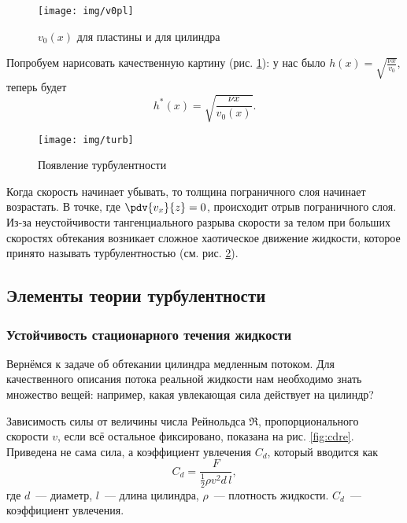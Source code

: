 \begin{figure}[h]
    \centering
    \texttt{[image: img/v0pl]}
    \caption{$v_0(x)$ для пластины и для цилиндра}
    \label{fig:v0pl}
\end{figure}
Попробуем нарисовать качественную картину (рис. \ref{fig:v0pl}): у нас было $h(x)=\sqrt{\frac{\nu x}{v_0}}$, теперь будет
\begin{equation}
    h^*(x) = \sqrt{\frac{\nu x}{v_0 (x)}}.
\end{equation}
\begin{figure}[H]
    \centering
    \texttt{[image: img/turb]}
    \caption{Появление турбулентности}
    \label{fig:prouavturb}
\end{figure}
Когда скорость начинает убывать, то толщина пограничного слоя начинает
возрастать. В точке, где $\pdv{v_x}{z}=0$, происходит отрыв пограничного
 слоя. Из-за  неустойчивости  тангенциального разрыва скорости за телом при больших скоростях обтекания  возникает  сложное хаотическое движение жидкости, которое принято называть турбулентностью (см. рис. \ref{fig:prouavturb}).

 \clearpage

\newpage
{}
\subsection{Элементы теории турбулентности}
\subsubsection{Устойчивость стационарного течения жидкости}
Вернёмся к задаче об обтекании цилиндра медленным потоком. Для качественного описания потока реальной жидкости нам необходимо знать множество вещей: например, какая увлекающая сила действует на цилиндр?

Зависимость силы от величины числа Рейнольдса $\Re$, пропорционального скорости $v$, если всё остальное фиксировано, показана на рис. \ref{fig:cdre}. Приведена не сама сила, а коэффициент увлечения $C_d$, который вводится как
\begin{equation}
    C_d  = \frac{F}{\frac{1}{2} \rho v^2 d\,l},
\end{equation}
где $d$~--- диаметр, $l$~--- длина цилиндра,
$\rho$~--- плотность жидкости. $C_d$~--- коэффициент увлечения.

